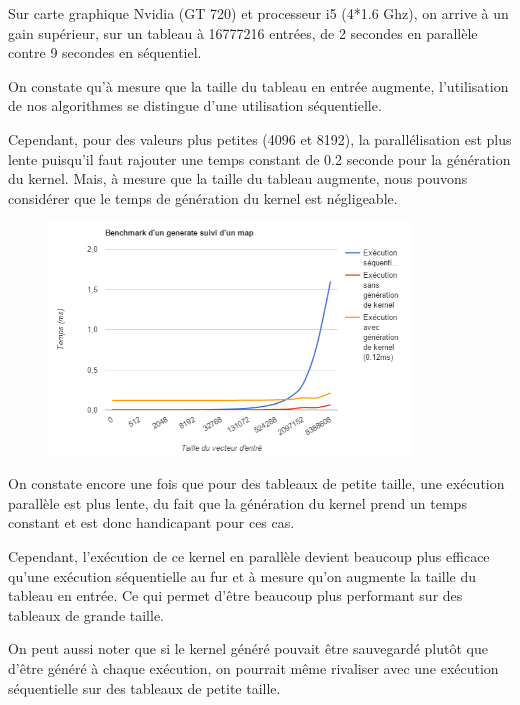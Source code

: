 \documentclass{report}
\begin{document}
Sur carte graphique Nvidia (GT 720) et processeur i5 (4*1.6 Ghz), on arrive à un gain supérieur, sur un tableau à 16777216 entrées, de 2 secondes en parallèle contre 9 secondes en séquentiel.\newline

On constate qu'à mesure que la taille du tableau en entrée augmente, l'utilisation de nos algorithmes se distingue d'une utilisation séquentielle.\newline

Cependant, pour des valeurs plus petites (4096 et 8192), la parallélisation est plus lente puisqu'il faut rajouter une temps constant de 0.2 seconde pour la génération du kernel. Mais, à mesure que la taille du tableau augmente, nous pouvons considérer que le temps de génération du kernel est négligeable.\newline

\begin{figure}[!h]
\begin{center}
\includegraphics[height=175pt]{images_finales/benchmark.png}
\end{center}
\caption{}
\label{test14}
\end{figure}


On constate encore une fois que pour des tableaux de petite taille, une exécution parallèle est plus lente, du fait que la génération du kernel prend un temps constant et est donc handicapant pour ces cas.\newline

Cependant, l'exécution de ce kernel en parallèle devient beaucoup plus efficace qu'une exécution séquentielle au fur et à mesure qu'on augmente la taille du tableau en entrée. Ce qui permet d'être beaucoup plus performant sur des tableaux de grande taille.\newline

On peut aussi noter que si le kernel généré pouvait être sauvegardé plutôt que d'être généré à chaque exécution, on pourrait même rivaliser avec une exécution séquentielle sur des tableaux de petite taille.\newline
\end{document}
